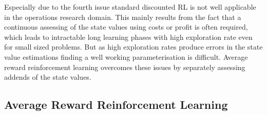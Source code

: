\documentclass[envcountsame]{llncs}
\begin{document}

Especially due to the fourth issue standard discounted RL is not well applicable in the operations
research domain. This mainly results from the fact that a continuous assessing of the state values
using costs or profit is often required, which leads to intractable long learning phases with high
exploration rate even for small sized problems. But as high exploration rates produce errors in the
state value estimations \citep{MillerVeinott1969} finding a well working parameterisation is
difficult. Average reward reinforcement learning overcomes these issues by separately assessing
addends of the state values.


\subsection{Average Reward Reinforcement Learning}
\end{document}
